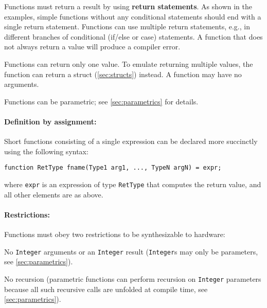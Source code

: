Functions must return a result by using \textbf{return statements}. %
As shown in the examples, simple functions without any conditional statements
should end with a single return statement.
Functions can use multiple return statements, e.g., in different branches
of conditional (if/else or case) statements.
A function that does not always return a value will produce a compiler error.

Functions can return only one value. To emulate returning multiple values, the
function can return a struct (\autoref{sec:structs}) instead.
%
A function may have no arguments.

Functions can be parametric; see \autoref{sec:parametrics} for details.

\paragraph{Definition by assignment:}
Short functions consisting of a single expression can be declared more succinctly using the following syntax:
\begin{center}
\verb|function RetType fname(Type1 arg1, ..., TypeN argN) = expr;|
\end{center}
where \verb|expr| is an expression of type \verb|RetType| that computes the return value,
and all other elements are as above.


\paragraph{Restrictions:}
Functions must obey two restrictions to be synthesizable to hardware:
\begin{compactenum}
\item No \texttt{Integer} arguments or an \texttt{Integer} result
  (\texttt{Integer}s may only be parameters, see \autoref{sec:parametrics}).
\item No recursion
  (parametric functions can perform recursion on \texttt{Integer} parameters
  because all such recursive calls are unfolded at compile time, see \autoref{sec:parametrics}).
\end{compactenum}

